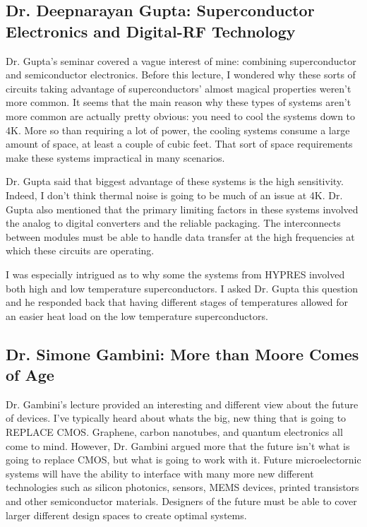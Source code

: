 \documentclass[journal]{IEEEtran}
\begin{document}
\subsection{Dr. Deepnarayan Gupta: Superconductor Electronics and Digital-RF Technology}
Dr. Gupta's seminar covered a vague interest of mine: combining superconductor and semiconductor electronics. Before this lecture, I wondered why these sorts of circuits taking advantage of superconductors' almost magical properties weren't more common. It seems that the main reason why these types of systems aren't more common are actually pretty obvious: you need to cool the systems down to 4K. More so than requiring a lot of power, the cooling systems consume a large amount of space, at least a couple of cubic feet. That sort of space requirements make these systems impractical in many scenarios.

Dr. Gupta said that biggest advantage of these systems is the high sensitivity. Indeed, I don't think thermal noise is going to be much of an issue at 4K. Dr. Gupta also mentioned that the primary limiting factors in these systems involved the analog to digital converters and the reliable packaging. The interconnects between modules must be able to handle data transfer at the high frequencies at which these circuits are operating.

I was especially intrigued as to why some the systems from HYPRES involved both high and low temperature superconductors. I asked Dr. Gupta this question and he responded back that having different stages of temperatures allowed for an easier heat load on the low temperature superconductors.


\subsection{Dr. Simone Gambini: More than Moore Comes of Age}
Dr. Gambini's lecture provided an interesting and different view about the future of devices. I've typically heard about whats the big, new thing that is going to REPLACE CMOS. Graphene, carbon nanotubes, and quantum electronics all come to mind. However, Dr. Gambini argued more that the future isn't what is going to replace CMOS, but what is going to work with it. Future microelectornic systems will have the ability to interface with many more new different technologies such as silicon photonics, sensors, MEMS devices, printed transistors and other semiconductor materials. Designers of the future must be able to cover larger different design spaces to create optimal systems. 
\end{document}
